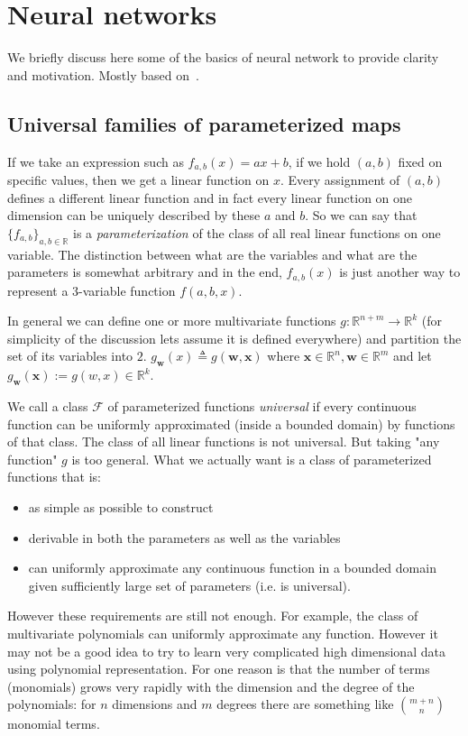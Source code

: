 \documentclass[11pt, a4paper]{report}
\theoremstyle{plain}
\theoremstyle{definition}
\theoremstyle{remark}
\newcommand{\R}{\mathbb{R}}
\newcommand{\x}{\mathbf{x}}
\newcommand{\w}{\mathbf{w}}
\begin{document}
\section{Neural networks}

We briefly discuss here some of the basics of neural network to provide clarity
and motivation. Mostly based on~\cite{nielsen2015neural}.

\subsection{Universal families of parameterized maps}
If we take an expression such as $f_{a,b}(x) = ax + b$, if we hold $(a,b)$ fixed
on specific values, then we get a linear function on $x$. Every assignment of
$(a,b)$ defines a different linear function and in fact every linear function on
one dimension can be uniquely described by these $a$ and $b$. So we can say that
$\{f_{a,b}\}_{a,b \in \R}$ is a \emph{parameterization} of the class of all real
linear functions on one variable. The distinction between what are the variables and what are
the parameters is somewhat arbitrary
and in the end, $f_{a,b}(x)$ is just another way to represent 
a $3$-variable function $f(a,b,x)$. 

In general we can define one or more multivariate
functions $g : \R^{n+m} \to \R^k$ (for simplicity of the discussion lets assume 
it is defined everywhere) and partition the set of its variables into $2$. 
$g_{\w}(x) \triangleq g(\w,\x)$ where 
$\x \in \R^n, \w
\in \R^m$ and let $g_{\w}(\x) := g(w,x) \in \R^k$.


We call a class $\mathcal{F}$ of parameterized functions \emph{universal} if
every continuous function can be uniformly approximated (inside a bounded
domain) by functions of that class. The class of all linear functions is not
universal. But taking "any function" $g$ is too general. What we actually want
is a class of parameterized functions that is:
\begin{itemize}
\item{} as simple as possible to construct
\item{} derivable in both the parameters as well as the variables
\item{} can uniformly approximate any continuous function in a bounded domain
given sufficiently large set of
parameters (i.e. is universal).
\end{itemize}

However these requirements are still not enough.
For example, the class of multivariate polynomials can
uniformly approximate any function. However it may not be a good idea to try
to learn very complicated high dimensional data using polynomial representation. 
For one reason is that the number of terms (monomials) grows very rapidly with the
dimension and the degree of the polynomials: for $n$ dimensions and $m$ degrees
there are something like $\binom{m + n}{n}$ monomial terms.
\end{document}
